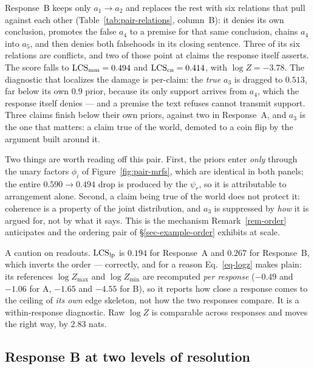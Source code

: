 \begin{example}[Incoherent]
\label{ex-pair-incoherent}
Response~B keeps only $a_1\!\to\!a_2$ and replaces the rest with six relations that pull against each
other (Table~\ref{tab:pair-relations}, column~B): it denies its own conclusion, promotes the false
$a_4$ to a premise for that same conclusion, chains $a_4$ into $a_5$, and then denies both
falsehoods in its closing sentence. Three of its six relations are conflicts, and two of those point
at claims the response itself asserts. The score falls to $\mathrm{LCS}_{\mathrm{mm}}=0.494$ and $\mathrm{LCS}_{\mathrm{cn}}=0.414$, with $\log Z=-3.78$. The diagnostic that
localizes the damage is per-claim: the \emph{true} $a_3$ is dragged to $0.513$, far below its own
$0.9$ prior, because its only support arrives from $a_4$, which the response itself denies --- and a
premise the text refuses cannot transmit support. Three claims finish below their own priors,
against two in Response~A, and $a_3$ is the one that matters: a claim true of the world, demoted to
a coin flip by the argument built around it.
\end{example}

Two things are worth reading off this pair. First, the priors enter \emph{only} through the unary
factors $\phi_i$ of Figure~\ref{fig:pair-mrfs}, which are identical in both panels; the entire
$0.590\to0.494$ drop is produced by the $\psi_r$, so it is attributable to arrangement alone.
Second, a claim being true of the world does not protect it: coherence is a property of the joint
distribution, and $a_3$ is suppressed by \emph{how} it is argued for, not by what it says. This is
the mechanism Remark~\ref{rem-order} anticipates and the ordering pair of
\S\ref{sec-example-order} exhibits at scale.

A caution on readouts. $\mathrm{LCS}_{\mathrm{lp}}$ is $0.194$ for Response~A and $0.267$ for Response~B, which
inverts the order --- correctly, and for a reason Eq.~\ref{eq-logz} makes plain: its references
$\log Z_{\max}$ and $\log Z_{\min}$ are recomputed \emph{per response} ($-0.49$ and $-1.06$ for A,
$-1.65$ and $-4.55$ for B), so it reports how close a response comes to the ceiling of \emph{its
own} edge skeleton, not how the two responses compare. It is a within-response diagnostic. Raw
$\log Z$ is comparable across responses and moves the right way, by $2.83$ nats.

\subsection{Response B at two levels of resolution}
\label{sec-example-b-anatomy}

